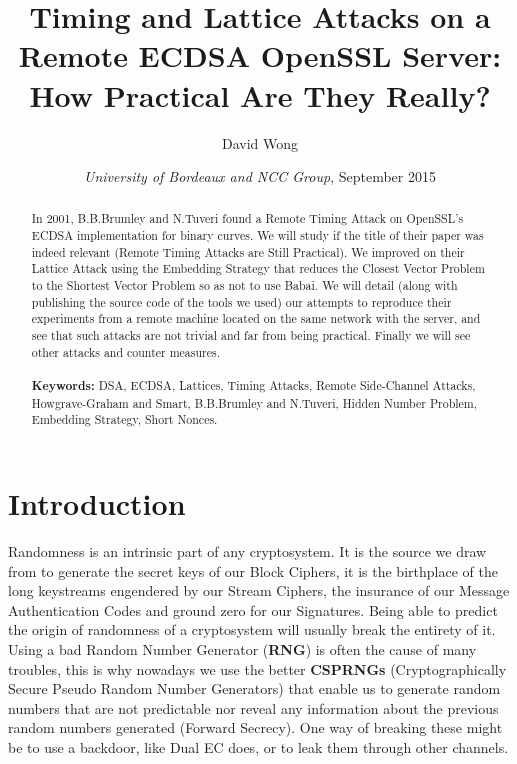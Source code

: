 \documentclass[a4paper,11pt]{article}
\title{Timing and Lattice Attacks on a Remote ECDSA OpenSSL Server: How Practical Are They Really?}
\author{David Wong}
\date{\emph{University of Bordeaux and NCC Group}, \small{September 2015}}
\begin{document}
\maketitle

\renewcommand{\abstractname}{Abstract}
\begin{abstract}
In 2001, B.B.Brumley and N.Tuveri found a Remote Timing Attack on OpenSSL's ECDSA implementation for binary curves. We will study if the title of their paper was indeed relevant (Remote Timing Attacks are Still Practical). We improved on their Lattice Attack using the Embedding Strategy that reduces the Closest Vector Problem to the Shortest Vector Problem so as not to use Babai. We will detail (along with publishing the source code of the tools we used) our attempts to reproduce their experiments from a remote machine located on the same network with the server, and see that such attacks are not trivial and far from being practical. Finally we will see other attacks and counter measures.\\
\\
\textbf{Keywords:} DSA, ECDSA, Lattices, Timing Attacks, Remote Side-Channel Attacks, Howgrave-Graham and Smart, B.B.Brumley and N.Tuveri, Hidden Number Problem, Embedding Strategy, Short Nonces.\\

\end{abstract}

\section{Introduction}\label{introduction}

Randomness is an intrinsic part of any cryptosystem. It is the source we draw from to generate the secret keys of our Block Ciphers, it is the birthplace of the long keystreams engendered by our Stream Ciphers, the insurance of our Message Authentication Codes and ground zero for our Signatures. Being able to predict the origin of randomness of a cryptosystem will usually break the entirety of it. Using a bad Random Number Generator (\textbf{RNG}) is often the cause of many troubles, this is why nowadays we use the better \textbf{CSPRNGs} (Cryptographically Secure Pseudo Random Number Generators) that enable us to generate random numbers that are not predictable nor reveal any information about the previous random numbers generated (Forward Secrecy). One way of breaking these might be to use a backdoor, like Dual EC\cite{dualec} does, or to leak them through other channels.
\end{document}
